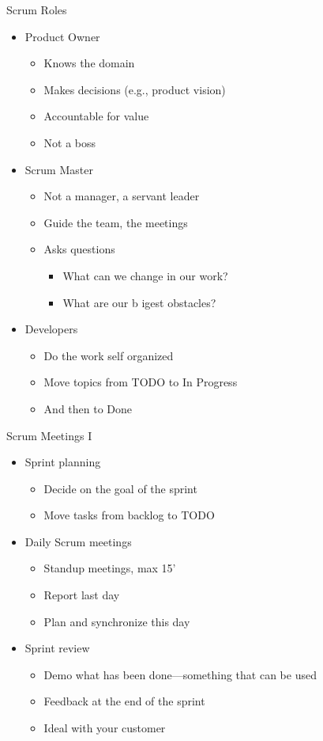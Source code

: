 \begin{frame}[fragile]{Scrum Roles}
\begin{itemize}
\item Product Owner
\begin{itemize}
\item Knows the domain
\item Makes decisions (e.g., product vision)
\item Accountable for value
\item Not a boss
\end{itemize}
\item Scrum Master
\begin{itemize}
\item Not a manager, a servant leader
\item Guide the team, the meetings
\item Asks questions
\begin{itemize}
\item What can we change in our work?
\item What are our b igest obstacles?
\end{itemize}
\end{itemize}
\item Developers
\begin{itemize}
\item Do the work self organized
\item Move topics from TODO to In Progress
\item And then to Done
\end{itemize}
\end{itemize}
\end{frame}

\begin{frame}[fragile]{Scrum Meetings I}
\begin{itemize}
\item Sprint planning
\begin{itemize}
\item Decide on the goal of the sprint
\item Move tasks from backlog to TODO
\end{itemize}
\item Daily Scrum meetings
\begin{itemize}
\item Standup meetings, max 15'
\item Report last day
\item Plan and synchronize this day
\end{itemize}
\item Sprint review
\begin{itemize}
\item Demo what has been done---something that can be used
\item Feedback at the end of the sprint
\item Ideal with your customer
\end{itemize}
\end{itemize}
\end{frame}

